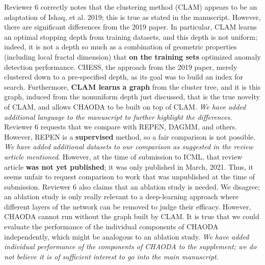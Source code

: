 \documentclass{article}
\begin{document}
Reviewer 6 correctly notes that the clustering method (CLAM) appears to be an adaptation of Ishaq, et al. 2019; this is true as stated in the manuscript.
However, there are significant differences from the 2019 paper.
In particular, CLAM learns an optimal stopping depth from training datasets, and this depth is not uniform; indeed, it is not a depth so much as a combination of geometric properties (including local fractal dimension) that \textbf{on the training sets} optimized anomaly detection performance. CHESS, the approach from the 2019 paper, merely clustered down to a pre-specified depth, as its goal was to build an index for search.
Furthermore, \textbf{CLAM learns a graph} from the cluster tree, and it is this graph, induced from the nonuniform depth just discussed, that is the true novelty of CLAM, and allows CHAODA to be built on top of CLAM.
\emph{We have added additional language to the manuscript to further highlight the differences}.
Reviewer 6 requests that we compare with REPEN, DAGMM, and others.
However, REPEN is a \textbf{supervised} method, so a fair comparison is not possible.
\emph{We have added additional datasets to our comparison as suggested in the review article mentioned}.
However, at the time of submission to ICML, that review article \textbf{was not yet published}; it was only published in March, 2021.
Thus, it seems unfair to request comparison to work that was unpublished at the time of submission.
Reviewer 6 also claims that an ablation study is needed.
We disagree; an ablation study is only really relevant to a deep-learning approach where different layers of the network can be removed to judge their efficacy.
However, CHAODA cannot run without the graph built by CLAM.
It is true that we could evaluate the performance of the individual components of CHAODA independently, which might be analogous to an ablation study.
\emph{We have added individual performance of the components of CHAODA to the supplement; we do not believe it is of sufficient interest to go into the main manuscript}.
\end{document}
